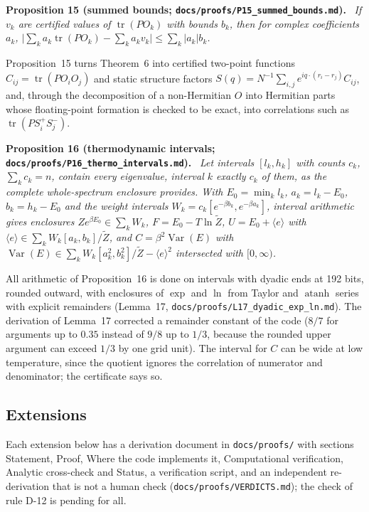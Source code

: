 \documentclass[11pt,a4paper]{article}
\newcommand{\code}[1]{\texttt{#1}}
\newcommand{\abs}[1]{\lvert #1\rvert}
\newcommand{\tr}{\operatorname{tr}}
\newenvironment{result}[1]{\par\medskip\noindent\textbf{#1.}\ \itshape}{\par\medskip}
\begin{document}
\begin{result}{Proposition 15 (summed bounds; \code{docs/proofs/P15\_summed\_bounds.md})}
If $v_k$ are certified values of $\tr(PO_k)$ with bounds $b_k$, then for complex coefficients $a_k$,
$\abs{\sum_ka_k\tr(PO_k)-\sum_ka_kv_k}\le\sum_k\abs{a_k}b_k$.
\end{result}

Proposition~15 turns Theorem~6 into certified two-point functions $C_{ij}=\tr(PO_iO_j)$ and static structure factors
$S(q)=N^{-1}\sum_{i,j}e^{iq\cdot(r_i-r_j)}C_{ij}$, and, through the decomposition of a non-Hermitian $O$ into Hermitian
parts whose floating-point formation is checked to be exact, into correlations such as $\tr(PS^+_iS^-_j)$.

\begin{result}{Proposition 16 (thermodynamic intervals; \code{docs/proofs/P16\_thermo\_intervals.md})}
Let intervals $[l_k,h_k]$ with counts $c_k$, $\sum_kc_k=n$, contain every eigenvalue, interval $k$ exactly $c_k$ of
them, as the complete whole-spectrum enclosure provides. With $E_0=\min_kl_k$, $a_k=l_k-E_0$, $b_k=h_k-E_0$ and the
weight intervals $W_k=c_k[e^{-\beta b_k},e^{-\beta a_k}]$, interval arithmetic gives enclosures
$Ze^{\beta E_0}\in\sum_kW_k$, $F=E_0-T\ln\tilde Z$, $U=E_0+\langle e\rangle$ with $\langle e\rangle\in\sum_kW_k[a_k,b_k]/
\tilde Z$, and $C=\beta^2\operatorname{Var}(E)$ with $\operatorname{Var}(E)\in\sum_kW_k[a_k^2,b_k^2]/\tilde Z-\langle
e\rangle^2$ intersected with $[0,\infty)$.
\end{result}

All arithmetic of Proposition~16 is done on intervals with dyadic ends at 192 bits, rounded outward, with enclosures of
$\exp$ and $\ln$ from Taylor and $\operatorname{atanh}$ series with explicit remainders (Lemma~17,
\code{docs/proofs/L17\_dyadic\_exp\_ln.md}). The derivation of Lemma~17 corrected a remainder constant of the code
($8/7$ for arguments up to $0.35$ instead of $9/8$ up to $1/3$, because the rounded upper argument can exceed $1/3$ by
one grid unit). The interval for $C$ can be wide at low temperature, since the quotient ignores the correlation of
numerator and denominator; the certificate says so.

\subsection{Extensions}
\label{sec:extensions}

Each extension below has a derivation document in \code{docs/proofs/} with sections Statement, Proof, Where the code
implements it, Computational verification, Analytic cross-check and Status, a verification script, and an independent
re-derivation that is not a human check (\code{docs/proofs/VERDICTS.md}); the check of rule D-12 is pending for all.
\end{document}
